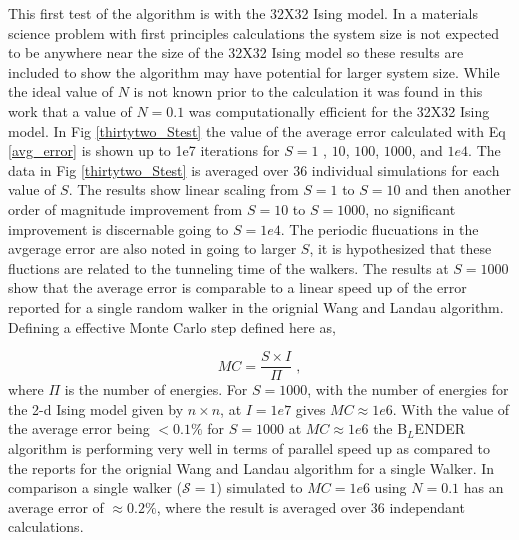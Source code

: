 \documentclass[aps,prl,reprint,superscriptaddress,showkeys]{revtex4-1}
\begin{document}
This first test of the algorithm is with the 32X32 Ising model. In a materials science problem with first principles calculations the system size is not expected to be anywhere near the size of the  32X32 Ising model so these results are included to show the algorithm may have potential for larger system size. While the ideal value of $N$ is not known prior to the calculation it was found in this work that a value of $N=0.1$ was computationally efficient for the 32X32 Ising model. In Fig \ref{thirtytwo_Stest} the value of the average error calculated with Eq \ref{avg_error} is shown up to 1e7 iterations for $S=1$ , $10$, $100$, $1000$, and $1e4$. The data in Fig \ref{thirtytwo_Stest} is averaged over 36 individual simulations for each value of $S$. The results show linear scaling from $S=1$ to $S=10$ and then another order of magnitude improvement from $S=10$ to $S=1000$, no significant improvement is discernable going to $S=1e4$.  The periodic flucuations in the avgerage error are also noted in going to larger $S$, it is hypothesized that these fluctions are related to the tunneling time of the walkers. The results at $S=1000$ show that the average error is comparable to a linear speed up of the error reported for a single random walker in the orignial Wang and Landau algorithm. Defining a effective Monte Carlo step defined here as,

\begin{equation}
MC = \frac{S\times I}{\Pi} \;,
\end{equation} 
where $\Pi$ is the number of energies.  For $S=1000$, with the number of energies for the 2-d Ising model given by $n\times n$, at $I=1e7$ gives $MC \approx 1e6$. With the value of the average error being $<0.1\%$ for $S=1000$ at $MC\approx 1e6$ the B$_L$ENDER algorithm is performing very well in terms of parallel speed up as compared to the reports for the orignial Wang and Landau algorithm for a single Walker\cite{WL_phys_rev_lett}.  In comparison a single walker ($\mathcal{S}=1$) simulated to $MC = 1e6$ using $N=0.1$ has an average error of $\approx 0.2\%$, where the result is averaged over 36 independant calculations.
\end{document}
